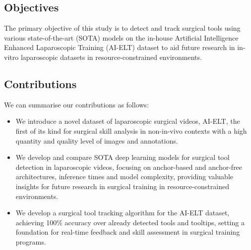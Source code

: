 
\subsection{Objectives}

The primary objective of this study is to detect and track surgical tools using various state-of-the-art (SOTA) models on the in-house Artificial Intelligence Enhanced Laparoscopic Training (AI-ELT) dataset to aid future research in in-vitro laparoscopic datasets in resource-constrained environments.

\subsection{Contributions}

We can summarise our contributions as follows:

\begin{itemize}[noitemsep, left=0pt]
\item We introduce a novel dataset of laparoscopic surgical videos, AI-ELT, the first of its kind for surgical skill analysis in non-in-vivo contexts with a high quantity and quality level of images and annotations.
\item We develop and compare SOTA deep learning models for surgical tool detection in laparoscopic videos, focusing on anchor-based and anchor-free architectures, inference times and model complexity, providing valuable insights for future research in surgical training in resource-constrained environments.
\item We develop a surgical tool tracking algorithm for the AI-ELT dataset, achieving 100\% accuracy over already detected tools and tooltips, setting a foundation for real-time feedback and skill assessment in surgical training programs.
\end{itemize}

